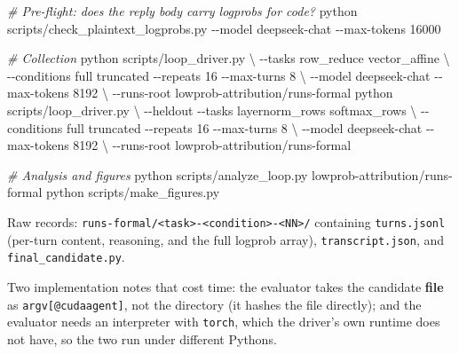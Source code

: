 \documentclass[
  11pt,
]{article}
\newenvironment{Shaded}{}{}
\newcommand{\AttributeTok}[1]{\textcolor[rgb]{0.49,0.56,0.16}{#1}}
\newcommand{\CommentTok}[1]{\textcolor[rgb]{0.38,0.63,0.69}{\textit{#1}}}
\newcommand{\DataTypeTok}[1]{\textcolor[rgb]{0.56,0.13,0.00}{#1}}
\newcommand{\ExtensionTok}[1]{#1}
\newcommand{\NormalTok}[1]{#1}
\begin{document}
\begin{Shaded}
\begin{Highlighting}[]
\CommentTok{\# Pre{-}flight: does the reply body carry logprobs for code?}
\ExtensionTok{python}\NormalTok{ scripts/check\_plaintext\_logprobs.py }\AttributeTok{{-}{-}model}\NormalTok{ deepseek{-}chat }\AttributeTok{{-}{-}max{-}tokens}\NormalTok{ 16000}

\CommentTok{\# Collection}
\ExtensionTok{python}\NormalTok{ scripts/loop\_driver.py }\DataTypeTok{\textbackslash{}}
    \AttributeTok{{-}{-}tasks}\NormalTok{ row\_reduce vector\_affine }\DataTypeTok{\textbackslash{}}
    \AttributeTok{{-}{-}conditions}\NormalTok{ full truncated }\AttributeTok{{-}{-}repeats}\NormalTok{ 16 }\AttributeTok{{-}{-}max{-}turns}\NormalTok{ 8 }\DataTypeTok{\textbackslash{}}
    \AttributeTok{{-}{-}model}\NormalTok{ deepseek{-}chat }\AttributeTok{{-}{-}max{-}tokens}\NormalTok{ 8192 }\DataTypeTok{\textbackslash{}}
    \AttributeTok{{-}{-}runs{-}root}\NormalTok{ lowprob{-}attribution/runs{-}formal}
\ExtensionTok{python}\NormalTok{ scripts/loop\_driver.py }\DataTypeTok{\textbackslash{}}
    \AttributeTok{{-}{-}heldout} \AttributeTok{{-}{-}tasks}\NormalTok{ layernorm\_rows softmax\_rows }\DataTypeTok{\textbackslash{}}
    \AttributeTok{{-}{-}conditions}\NormalTok{ full truncated }\AttributeTok{{-}{-}repeats}\NormalTok{ 16 }\AttributeTok{{-}{-}max{-}turns}\NormalTok{ 8 }\DataTypeTok{\textbackslash{}}
    \AttributeTok{{-}{-}model}\NormalTok{ deepseek{-}chat }\AttributeTok{{-}{-}max{-}tokens}\NormalTok{ 8192 }\DataTypeTok{\textbackslash{}}
    \AttributeTok{{-}{-}runs{-}root}\NormalTok{ lowprob{-}attribution/runs{-}formal}

\CommentTok{\# Analysis and figures}
\ExtensionTok{python}\NormalTok{ scripts/analyze\_loop.py lowprob{-}attribution/runs{-}formal}
\ExtensionTok{python}\NormalTok{ scripts/make\_figures.py}
\end{Highlighting}
\end{Shaded}

Raw records:
\texttt{runs-formal/\textless{}task\textgreater{}-\textless{}condition\textgreater{}-\textless{}NN\textgreater{}/}
containing \texttt{turns.jsonl} (per-turn content, reasoning, and the
full logprob array), \texttt{transcript.json}, and
\texttt{final\_candidate.py}.

Two implementation notes that cost time: the evaluator takes the
candidate \textbf{file} as \texttt{argv{[}@cudaagent{]}}, not the
directory (it hashes the file directly); and the evaluator needs an
interpreter with \texttt{torch}, which the driver's own runtime does not
have, so the two run under different Pythons.
\end{document}
